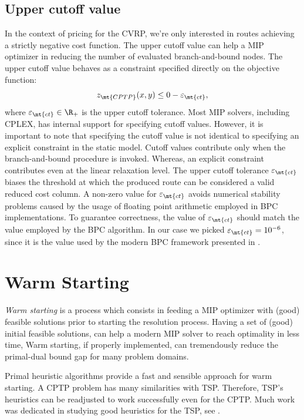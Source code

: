 \subsection{Upper cutoff value}
\label{sec:impl-upper-cutoff-value}

In the context of pricing for the CVRP,
we're only interested in routes achieving a strictly negative cost function.
The upper cutoff value can help a MIP optimizer
in reducing the number of evaluated branch-and-bound nodes.
The upper cutoff value behaves as a constraint specified directly on the objective function:
\begin{equation}
	z_\mt{CPTP}(x, y) \le 0 - \varepsilon_{\mt{ct}},
\end{equation}
where $\varepsilon_{\mt{ct}} \in \R_+$ is the upper cutoff tolerance.
Most MIP solvers, including CPLEX, has internal support for specifying cutoff values.
However, it is important to note that specifying the cutoff value is not identical
to specifying an explicit constraint in the static model.
Cutoff values contribute only when the branch-and-bound procedure is invoked.
Whereas, an explicit constraint contributes even at the linear relaxation level.
The upper cutoff tolerance $\varepsilon_{\mt{ct}}$ biases the threshold at which the produced
route can be considered a valid reduced cost column.
A non-zero value for $\varepsilon_{\mt{ct}}$ avoids numerical
stability problems caused by the usage of floating point arithmetic
employed in BPC implementations.
To guarantee correctness, the value of $\varepsilon_{\mt{ct}}$ should match the
value employed by the BPC algorithm.
In our case we picked $\varepsilon_{\mt{ct}} = 10^{-6}$,
since it is the value used by the modern BPC framework presented in \textcite{sadykov2021}.

\section{Warm Starting}
\label{sec:impl-warm-starting}

\textit{Warm starting} is a process which consists in feeding
a MIP optimizer with (good) feasible solutions
prior to starting the resolution process.
Having a set of (good) initial feasible solutions,
can help a modern MIP solver to reach optimality in less time,
Warm starting, if properly implemented,
can tremendously reduce the primal-dual bound gap for many problem domains.

Primal heuristic algorithms provide a fast and sensible approach for warm starting.
A CPTP problem has many similarities with TSP.
Therefore,
TSP's heuristics can be readjusted to work successfully even for the CPTP.
Much work was dedicated in studying good heuristics for the TSP,
see \cite{rosenkrantz1977, johnson1997, laporte1992, johnson2007, hoffman2013}.

